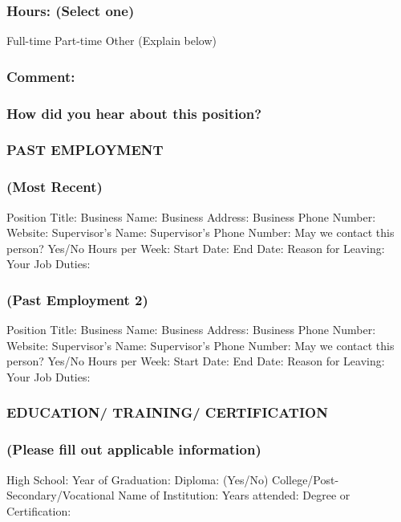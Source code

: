 \subsubsection*{Hours: (Select one)}
\break Full-time
\break Part-time
\break Other (Explain below)

\subsubsection*{Comment:}

\subsubsection*{How did you hear about this position?}

\subsubsection*{PAST EMPLOYMENT}

\subsubsection*{(Most Recent)}
\break Position Title:
\break Business Name:
\break Business Address:
\break Business Phone Number:
\break Website:
\break Supervisor's Name:
\break Supervisor's Phone Number:
\break May we contact this person? Yes/No
\break Hours per Week:
\break Start Date:
\break End Date:
\break Reason for Leaving:
\break Your Job Duties:

\subsubsection*{(Past Employment 2)}
\break Position Title:
\break Business Name:
\break Business Address:
\break Business Phone Number:
\break Website:
\break Supervisor's Name:
\break Supervisor's Phone Number:
\break May we contact this person? Yes/No
\break Hours per Week:
\break Start Date:
\break End Date:
\break Reason for Leaving:
\break Your Job Duties:

\subsubsection*{EDUCATION/ TRAINING/ CERTIFICATION}

\subsubsection*{(Please fill out applicable information) }
\break High School:
\break Year of Graduation:
\break Diploma: (Yes/No)
\break College/Post-Secondary/Vocational
\break Name of Institution:
\break Years attended:
\break Degree or Certification:

